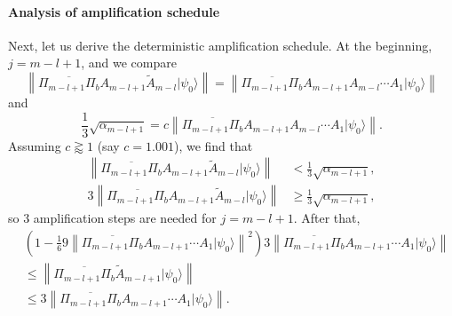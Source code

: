 \documentclass[letterpaper,onecolumn,11pt,accepted=2026-02-14]{quantumarticle}
\newcommand{\norm}[1]{\left\lVert#1\right\rVert}
\theoremstyle{remark}
\theoremstyle{plain}
\newcommand{\ket}[1]{|#1\rangle}
\begin{document}
\paragraph{Analysis of amplification schedule}
Next, let us derive the deterministic amplification schedule. At the beginning, $j=m-l+1$, and we compare
\begin{equation}
    \norm{\overline{\Pi_{m-l+1}\Pi_b}A_{m-l+1}\widetilde A_{m-l}\ket{\psi_0}}
    =\norm{\overline{\Pi_{m-l+1}\Pi_b}A_{m-l+1}A_{m-l}\cdots A_1\ket{\psi_0}}
\end{equation}
and
\begin{equation}
    \frac{1}{3}\sqrt{\alpha_{m-l+1}}
    =c\norm{\overline{\Pi_{m-l+1}\Pi_b}A_{m-l+1}A_{m-l}\cdots A_1\ket{\psi_0}}.
\end{equation}
Assuming $c\gtrapprox1$ (say $c=1.001$), we find that
\begin{equation}
\begin{aligned}
    \norm{\overline{\Pi_{m-l+1}\Pi_b}A_{m-l+1}\widetilde A_{m-l}\ket{\psi_0}}&<\frac{1}{3}\sqrt{\alpha_{m-l+1}},\\
    3\norm{\overline{\Pi_{m-l+1}\Pi_b}A_{m-l+1}\widetilde A_{m-l}\ket{\psi_0}}&\geq\frac{1}{3}\sqrt{\alpha_{m-l+1}},
\end{aligned}
\end{equation}
so $3$ amplification steps are needed for $j=m-l+1$. After that, 
\begin{equation}
\begin{aligned}
    &\left(1-\frac{1}{6}9\norm{\overline{\Pi_{m-l+1}\Pi_b}A_{m-l+1}\cdots A_1\ket{\psi_0}}^2\right)3\norm{\overline{\Pi_{m-l+1}\Pi_b}A_{m-l+1}\cdots A_1\ket{\psi_0}}\\
    &\leq\norm{\overline{\Pi_{m-l+1}\Pi_b}\widetilde A_{m-l+1}\ket{\psi_0}}\\
    &\leq3\norm{\overline{\Pi_{m-l+1}\Pi_b}A_{m-l+1}\cdots A_1\ket{\psi_0}}.
\end{aligned}
\end{equation}
\end{document}
